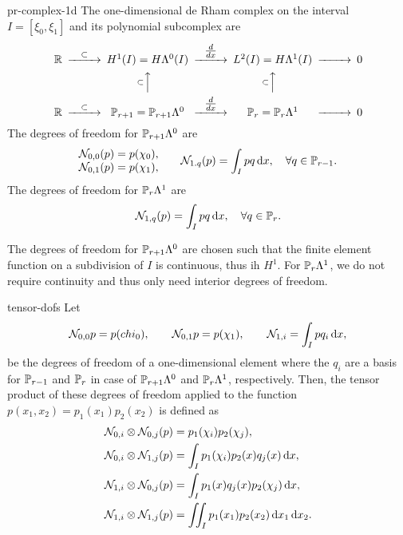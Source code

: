 \begin{Definition}{pr-complex-1d}
  The one-dimensional de Rham complex on the interval $I = [\xi_0,\xi_1]$ and
  its polynomial subcomplex are
  \begin{gather}
    \begin{CD}
    \R
    @>{\subset}>>
    H^1(I) = H\Lambda^0(I)
    @>{\tfrac{d}{dx}}>>
    L^2(I) = H\Lambda^1(I)
    @>>> 0
    \\
    @.
    @A{\subset}AA
    @A{\subset}AA
    \\
    \R
    @>{\subset}>>
    \P_{r+1} = \P_{r+1}\Lambda^0
    @>{\tfrac{d}{dx}}>>
    \P_r = \P_r\Lambda^1
    @>>> 0
    \end{CD}
  \end{gather}
  The degrees of freedom for $\P_{r+1}\Lambda^0$ are
  \begin{gather}
    \begin{matrix}
    \nodal_{0,0}(p) = p(\chi_0),\\
    \nodal_{0,1}(p) = p(\chi_1),
    \end{matrix}\qquad
    \nodal_{1.q}(p) = \int_{I} p q \dx,\quad\forall q\in\P_{r-1}.
  \end{gather}
  The degrees of freedom for $\P_{r}\Lambda^1$ are
  \begin{gather}
    \nodal_{1,q}(p) = \int_{I} p q \dx,\quad\forall q\in\P_{r}.
  \end{gather}
\end{Definition}

\begin{remark}
  The degrees of freedom for $\P_{r+1}\Lambda^0$ are chosen such that
  the finite element function on a subdivision of $I$ is continuous,
  thus ih $H^1$. For $\P_{r}\Lambda^1$, we do not require continuity
  and thus only need interior degrees of freedom.
\end{remark}

\begin{Definition}{tensor-dofs}
  Let
  \begin{gather}
    \nodal_{0,0} p = p(chi_0),\qquad \nodal_{0,1} p = p(\chi_1), \qquad
    \nodal_{1,i} = \int_I p q_i\dx,
  \end{gather}
  be the degrees of freedom of a one-dimensional element where the
  $q_i$ are a basis for $\P_{r-1}$ and $\P_r$ in case of
  $\P_{r+1}\Lambda^0$ and $\P_{r}\Lambda^1$, respectively. Then, the
  tensor product of these degrees of freedom applied to the function
  $p(x_1,x_2) = p_1(x_1)p_2(x_2)$ is defined as
  \begin{gather}
    \begin{split}
      \nodal_{0,i}\otimes\nodal_{0,j}(p) &= p_1(\chi_i) p_2(\chi_j),\\
      \nodal_{0,i}\otimes\nodal_{1,j}(p) &= \int_I p_1(\chi_i)  p_2(x)q_j(x)\dx,\\
      \nodal_{1,i}\otimes\nodal_{0,j}(p) &= \int_I p_1(x)q_j(x) p_2(\chi_j) \dx,\\
      \nodal_{1,i}\otimes\nodal_{1,j}(p) &= \iint_I p_1(x_1)
      p_2(x_2) \dx_1\dx_2.
    \end{split}
  \end{gather}
\end{Definition}

